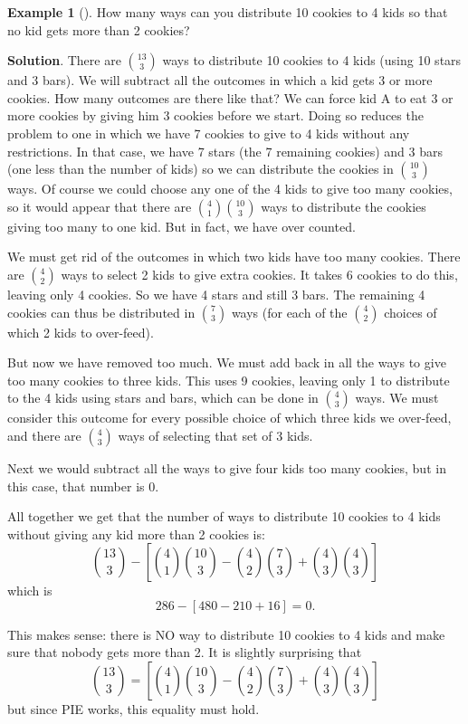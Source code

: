 \documentclass[10pt,]{book}
\theoremstyle{plain}
\theoremstyle{definition}
\theoremstyle{definition}
\newtheorem{example}[theorem]{Example}
\theoremstyle{definition}
\theoremstyle{definition}
\numberwithin{equation}{chapter}
\begin{document}
\begin{example}[]\label{example-12}
\hypertarget{p-848}{}%
How many ways can you distribute 10 cookies to 4 kids so that no kid gets more than 2 cookies?%
\par\smallskip%
\noindent\textbf{Solution}.\hypertarget{solution-77}{}\quad%
\hypertarget{p-849}{}%
There are \({13 \choose 3}\) ways to distribute 10 cookies to 4 kids (using 10 stars and 3 bars).  We will subtract all the outcomes in which a kid gets 3 or more cookies. How many outcomes are there like that? We can force kid A to eat 3 or more cookies by giving him 3 cookies before we start. Doing so reduces the problem to one in which we have 7 cookies to give to 4 kids without any restrictions. In that case, we have 7 stars (the 7 remaining cookies) and 3 bars (one less than the number of kids) so we can distribute the cookies in \({10 \choose 3}\) ways. Of course we could choose any one of the 4 kids to give too many cookies, so it would appear that there are \({4 \choose 1}{10 \choose 3}\) ways to distribute the cookies giving too many to one kid. But in fact, we have over counted.%
\par
\hypertarget{p-850}{}%
We must get rid of the outcomes in which two kids have too many cookies. There are \({4 \choose 2}\) ways to select 2 kids to give extra cookies. It takes 6 cookies to do this, leaving only 4 cookies. So we have 4 stars and still 3 bars. The remaining 4 cookies can thus be distributed in \({7 \choose 3}\) ways (for each of the \({4 \choose 2}\) choices of which 2 kids to over-feed).%
\par
\hypertarget{p-851}{}%
But now we have removed too much. We must add back in all the ways to give too many cookies to three kids. This uses 9 cookies, leaving only 1 to distribute to the 4 kids using stars and bars, which can be done in \({4 \choose 3}\) ways. We must consider this outcome for every possible choice of which three kids we over-feed, and there are \({4 \choose 3}\) ways of selecting that set of 3 kids.%
\par
\hypertarget{p-852}{}%
Next we would subtract all the ways to give four kids too many cookies, but in this case, that number is 0.%
\par
\hypertarget{p-853}{}%
All together we get that the number of ways to distribute 10 cookies to 4 kids without giving any kid more than 2 cookies is:%
\begin{equation*}
{13 \choose 3} - \left[{4 \choose 1}{10 \choose 3} - {4 \choose 2}{7 \choose 3} + {4\choose 3}{4\choose 3}\right]
\end{equation*}
which is%
\begin{equation*}
286 - [480 - 210 + 16] = 0.
\end{equation*}
%
\par
\hypertarget{p-854}{}%
This makes sense: there is NO way to distribute 10 cookies to 4 kids and make sure that nobody gets more than 2. It is slightly surprising that%
\begin{equation*}
{13 \choose 3} = \left[{4 \choose 1}{10 \choose 3} - {4 \choose 2}{7 \choose 3} + {4\choose 3}{4\choose 3}\right]
\end{equation*}
but since PIE works, this equality must hold.%
\end{example}
\end{document}
